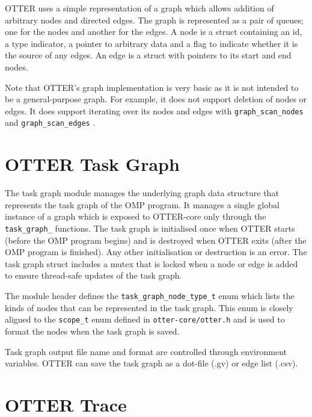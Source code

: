 \documentclass[11pt,a4paper]{article}
\newcommand{\code}[1]{\texttt{#1} }
\begin{document}
OTTER uses a simple representation of a graph which allows addition of arbitrary nodes and directed edges. The graph is represented as a pair of queues; one for the nodes and another for the edges. A node is a struct containing an id, a type indicator, a pointer to arbitrary data and a flag to indicate whether it is the source of any edges. An edge is a struct with pointers to its start and end nodes.

Note that OTTER's graph implementation is very basic as it is not intended to be a general-purpose graph. For example, it does not support deletion of nodes or edges. It does support iterating over its nodes and edges with \code{graph\_scan\_nodes} and \code{graph\_scan\_edges}.

\section{OTTER Task Graph}

The task graph module manages the underlying graph data structure that represents the task graph of the OMP program. It manages a single global instance of a graph which is exposed to OTTER-core only through the \code{task\_graph\_} functions. The task graph is initialised once when OTTER starts (before the OMP program begins) and is destroyed when OTTER exits (after the OMP program is finished). Any other initialisation or destruction is an error. The task graph struct includes a mutex that is locked when a node or edge is added to ensure thread-safe updates of the task graph.

The module header defines the \code{task\_graph\_node\_type\_t} enum which lists the kinds of nodes that can be represented in the task graph. This enum is closely aligned to the \code{scope\_t} enum defined in \code{otter-core/otter.h} and is used to format the nodes when the task graph is saved.

Task graph output file name and format are controlled through environment variables. OTTER can save the task graph as a dot-file (.gv) or edge list (.csv).

\section{OTTER Trace}
\end{document}
